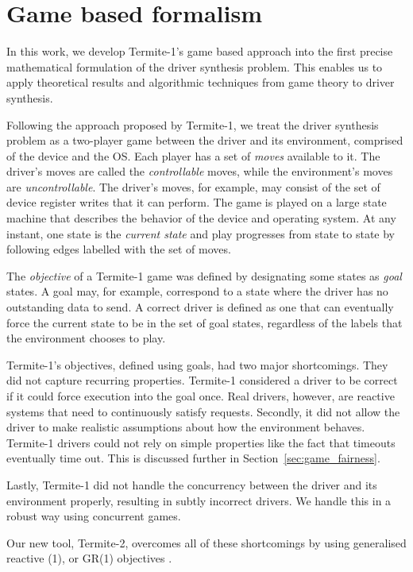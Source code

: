 \section{Game based formalism}

In this work, we develop Termite-1's game based approach into the first precise mathematical formulation of the driver synthesis problem.  This enables us to apply theoretical results and algorithmic techniques from game theory to driver synthesis. 

Following the approach proposed by Termite-1, we treat the driver synthesis problem as a two-player game between the driver and its environment, comprised of the device and the OS\@. Each player has a set of \emph{moves} available to it. The driver's moves are called the \emph{controllable} moves, while the environment's moves are \emph{uncontrollable}. The driver's moves, for example, may consist of the set of device register writes that it can perform. The game is played on a large state machine that describes the behavior of the device and operating system. At any instant, one state is the \emph{current state} and play progresses from state to state by following edges labelled with the set of moves. 

The \emph{objective} of a Termite-1 game was defined by designating some states as \emph{goal} states. A goal may, for example, correspond to a state where the driver has no outstanding data to send. A correct driver is defined as one that can eventually force the current state to be in the set of goal states, regardless of the labels that the environment chooses to play. 

Termite-1's objectives, defined using goals, had two major shortcomings. They did not capture recurring properties. Termite-1 considered a driver to be correct if it could force execution into the goal once. Real drivers, however, are reactive systems that need to continuously satisfy requests. Secondly, it did not allow the driver to make realistic assumptions about how the environment behaves. Termite-1 drivers could not rely on simple properties like the fact that timeouts eventually time out. This is discussed further in Section~\ref{sec:game_fairness}. 

Lastly, Termite-1 did not handle the concurrency between the driver and its environment properly, resulting in subtly incorrect drivers. We handle this in a robust way using concurrent games. 

Our new tool, Termite-2, overcomes all of these shortcomings by using generalised reactive (1), or GR(1) objectives \cite{Piterman_PS_06}.

